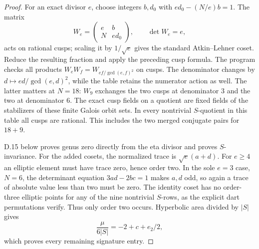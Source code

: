 \begin{proof}
For an exact divisor $e$, choose integers $b,d_0$ with $ed_0-(N/e)b=1$. The matrix
\[
 W_e=\begin{pmatrix}e&b\\N&ed_0\end{pmatrix},\qquad\det W_e=e,
\]
acts on rational cusps; scaling it by $1/\sqrt e$ gives the standard Atkin--Lehner coset. Reduce the resulting fraction and apply the preceding cusp formula. The program checks all products $W_eW_f=W_{ef/\gcd(e,f)^2}$ on cusps. The denominator changes by $d\mapsto ed/\gcd(e,d)^2$, while the table retains the numerator action as well. The latter matters at $N=18$: $W_9$ exchanges the two cusps at denominator $3$ and the two at denominator $6$. The exact cusp fields on a quotient are fixed fields of the stabilizers of these finite Galois orbit sets. In every nontrivial $S$-quotient in this table all cusps are rational. This includes the two merged conjugate pairs for $18+9$.

D.15 below proves genus zero directly from the eta divisor and proves $S$-invariance. For the added cosets, the normalized trace is $\sqrt e(a+d)$. For $e\geq4$ an elliptic element must have trace zero, hence order two. In the sole $e=3$ case, $N=6$, the determinant equation $3ad-2bc=1$ makes $a,d$ odd, so again a trace of absolute value less than two must be zero. The identity coset has no order-three elliptic points for any of the nine nontrivial $S$-rows, as the explicit dart permutations verify. Thus only order two occurs. Hyperbolic area divided by $|S|$ gives
\[
 \frac{\mu}{6|S|}=-2+c+e_2/2,
\]
which proves every remaining signature entry.
\end{proof}


